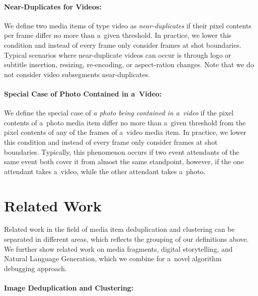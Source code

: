 \paragraph{Near-Duplicates for Videos:}

We define two media items of type video as \emph{near-duplicates}
if their pixel contents per frame differ no more
than a~given threshold.
In practice, we lower this condition and instead of every frame
only consider frames at shot boundaries.
Typical scenarios where near-duplicate videos can occur is through
logo or subtitle insertion, resizing, re-encoding,
or aspect-ration changes.
Note that we do not consider video subsegments near-duplicates.

\paragraph{Special Case of Photo Contained in a~Video:}

We define the special case of
\emph{a photo being contained in a~video} if the pixel contents
of a~photo media item differ no more than a~given threshold from
the pixel contents of any of the frames of a~video media item.
In practice, we lower this condition and instead of every frame
only consider frames at shot boundaries.
Typically, this phenomenon occurs if two event attendants
of the same event both cover it from almost the same
standpoint, however, if the one attendant takes a~video,
while the other attendant takes a~photo.

\section{Related Work}

Related work in the field of media item deduplication
and clustering can be separated in different areas,
which reflects the grouping of our definitions above.
We further show related work on media fragments,
digital storytelling, and Natural Language Generation,
which we combine for a~novel algorithm debugging approach.

\paragraph{Image Deduplication and Clustering:}

